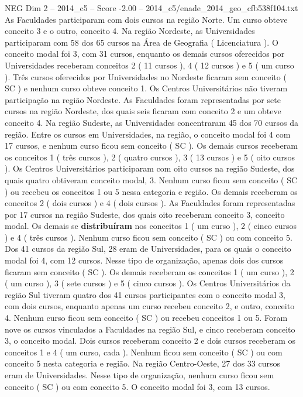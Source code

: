 \begin{textsample}{NEG Dim 2 – 2014\_c5 – Score -2.00 – 2014\_c5/enade\_2014\_geo\_cfb538f104.txt}
As Faculdades participaram com dois cursos na região Norte.
Um curso obteve conceito 3 e o outro, conceito 4.
Na região Nordeste, as Universidades participaram com 58 dos 65 cursos na Área de Geografia ( Licenciatura ).
O conceito modal foi 3, com 31 cursos, enquanto os demais cursos oferecidos por Universidades receberam conceitos 2 ( 11 cursos ), 4 ( 12 cursos ) e 5 ( um curso ).
Três cursos oferecidos por Universidades no Nordeste ficaram sem conceito ( SC ) e nenhum curso obteve conceito 1.
Os Centros Universitários não tiveram participação na região Nordeste.
As Faculdades foram representadas por sete cursos na região Nordeste, dos quais seis ficaram com conceito 2 e um obteve conceito 4.
Na região Sudeste, as Universidades concentraram 45 dos 70 cursos da região.
Entre os cursos em Universidades, na região, o conceito modal foi 4 com 17 cursos, e nenhum curso ficou sem conceito ( SC ).
Os demais cursos receberam os conceitos 1 ( três cursos ), 2 ( quatro cursos ), 3 ( 13 cursos ) e 5 ( oito cursos ).
Os Centros Universitários participaram com oito cursos na região Sudeste, dos quais quatro obtiveram conceito modal, 3.
Nenhum curso ficou sem conceito ( SC ) ou recebeu os conceitos 1 ou 5 nessa categoria e região.
Os demais receberam os conceitos 2 ( dois cursos ) e 4 ( dois cursos ).
As Faculdades foram representadas por 17 cursos na região Sudeste, dos quais oito receberam conceito 3, conceito modal.
Os demais se \textbf{distribuíram} nos conceitos 1 ( um curso ), 2 ( cinco cursos ) e 4 ( três cursos ).
Nenhum curso ficou sem conceito ( SC ) ou com conceito 5.
Dos 41 cursos da região Sul, 28 eram de Universidades, para os quais o conceito modal foi 4, com 12 cursos.
Nesse tipo de organização, apenas dois dos cursos ficaram sem conceito ( SC ).
Os demais receberam os conceitos 1 ( um curso ), 2 ( um curso ), 3 ( sete cursos ) e 5 ( cinco cursos ).
Os Centros Universitários da região Sul tiveram quatro dos 41 cursos participantes com o conceito modal 3, com dois cursos, enquanto apenas um curso recebeu conceito 2, e outro, conceito 4.
Nenhum curso ficou sem conceito ( SC ) ou recebeu conceitos 1 ou 5.
Foram nove os cursos vinculados a Faculdades na região Sul, e cinco receberam conceito 3, o conceito modal.
Dois cursos receberam conceito 2 e dois cursos receberam os conceitos 1 e 4 ( um curso, cada ).
Nenhum ficou sem conceito ( SC ) ou com conceito 5 nesta categoria e região.
Na região Centro-Oeste, 27 dos 33 cursos eram de Universidades.
Nesse tipo de organização, nenhum curso ficou sem conceito ( SC ) ou com conceito 5.
O conceito modal foi 3, com 13 cursos.

\end{textsample}
